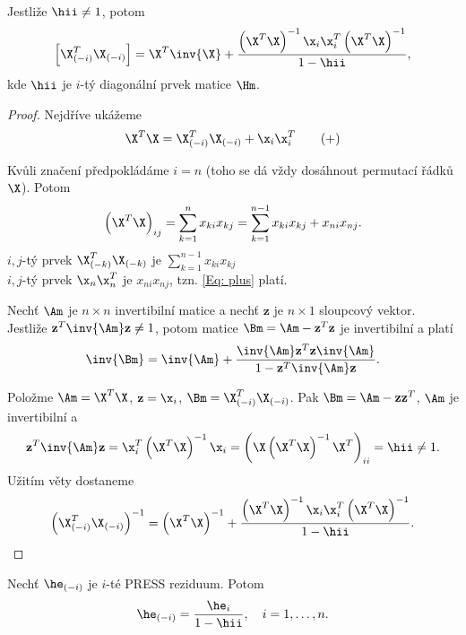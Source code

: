 \newcommand{\XtX}{\left( \X^T \X \right)^{-1}}

\begin{theorem}
Jestliže $\hii \neq 1$, potom
$$
\left[ \Xmi^T \Xmi \right] = \X^T \inv{\X} + \frac{\XtX \x_i \x_i^T \XtX}{1 - \hii},
$$
kde $\hii$ je $i$-tý diagonální prvek matice $\Hm$.
\end{theorem}

\begin{proof}
Nejdříve ukážeme
\begin{equation*}
	\X^T \X = \Xmi^T \Xmi + \x_i \x_i^T \tag{+} \label{Eq: plus}
\end{equation*}

\newcommand{\sumkn}{\sum_{k=1}^n}
\newcommand{\sumknn}{\sum_{k=1}^{n-1}}

Kvůli značení předpokládáme $i = n$ (toho se dá vždy dosáhnout permutací řádků $\X$). Potom
$$
\left( \X^T \X \right)_{ij} = \sumkn x_{ki} x_{kj} = \sumknn x_{ki} x_{kj} + x_{ni} x_{nj}.
$$
$i,j$-tý prvek $\X_{(-k)}^T \X_{(-k)}$ je $\sumknn x_{ki} x_{kj}$ \\
$i,j$-tý prvek $\x_n \x_n^T$ je $x_{ni} x_{nj}$, tzn. \eqref{Eq: plus} platí.


\newcommand{\z}{\mathbf{z}}

\begin{theorem}
Nechť $\Am$ je $n \times n$ invertibilní matice a nechť $\z$ je $n \times 1$ sloupcový vektor. Jestliže $\z^T \inv{\Am} \z \neq 1$, potom matice $\Bm = \Am - \z^T \z$ je invertibilní a platí
$$
\inv{\Bm} = \inv{\Am} + \frac{\inv{\Am} \z^T \z \inv{\Am}}{1 - \z^T \inv{\Am} \z}.
$$
\end{theorem}

Položme $\Am = \X^T \X$, $\z = \x_i$, $\Bm = \X_{(-i)}^T \X_{(-i)}$. Pak $\Bm = \Am - \z \z^T$, $\Am$ je invertibilní a
$$
\z^T \inv{\Am} \z = \x_i^T \XtX \x_i = \left( \X \XtX \X^T \right)_{ii} = \hii \neq 1.
$$
Užitím věty dostaneme
$$
\left(  \X_{(-i)}^T \X_{(-i)} \right)^{-1} = \XtX + \frac{\XtX \x_i \x_i^T \XtX}{1 - \hii}.
$$

\end{proof}

\begin{theorem}
	Nechť $\he_{(-i)}$ je $i$-té PRESS reziduum. Potom
	$$
	\he_{(-i)} = \frac{\he_i}{1 - \hii}, \quad i = 1, \dots, n.
	$$
\end{theorem}


